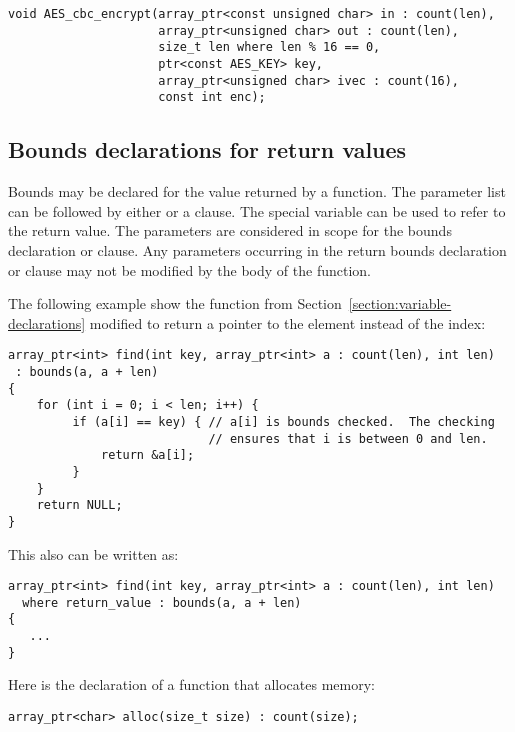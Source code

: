 \begin{lstlisting}
void AES_cbc_encrypt(array_ptr<const unsigned char> in : count(len),
                     array_ptr<unsigned char> out : count(len),
                     size_t len where len % 16 == 0,
                     ptr<const AES_KEY> key,
                     array_ptr<unsigned char> ivec : count(16),
                     const int enc);
\end{lstlisting}

\subsection{Bounds declarations for return values}

Bounds may be declared for the value returned by a function. The
parameter list can be followed by either \code{:}  or
a  clause. The special variable  can
be used to refer to the return value. The parameters are considered in
scope for the bounds declaration or  clause. Any parameters
occurring in the return bounds declaration or  clause may
not be modified by the body of the function.

The following example show the  function from
Section~\ref{section:variable-declarations} modified
to return a pointer to the element instead of the index:

\begin{lstlisting}
array_ptr<int> find(int key, array_ptr<int> a : count(len), int len)
 : bounds(a, a + len)
{
    for (int i = 0; i < len; i++) {
         if (a[i] == key) { // a[i] is bounds checked.  The checking
                            // ensures that i is between 0 and len.
             return &a[i];
         }
    }
    return NULL;
}
\end{lstlisting}

This also can be written as:

\begin{lstlisting}
array_ptr<int> find(int key, array_ptr<int> a : count(len), int len)
  where return_value : bounds(a, a + len)
{
   ...
}
\end{lstlisting}
Here is the declaration of a function that allocates memory:

\begin{lstlisting}
array_ptr<char> alloc(size_t size) : count(size);
\end{lstlisting}



